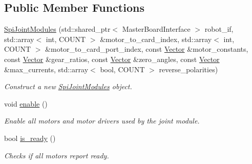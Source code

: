 \subsection*{Public Member Functions}
\begin{DoxyCompactItemize}
\item 
\mbox{\label{classblmc__robots_1_1SpiJointModules_afae5860967bce60813f72ae905b81d13}} 
\hyperlink{classblmc__robots_1_1SpiJointModules_afae5860967bce60813f72ae905b81d13}{Spi\+Joint\+Modules} (std\+::shared\+\_\+ptr$<$ Master\+Board\+Interface $>$ robot\+\_\+if, std\+::array$<$ int, C\+O\+U\+NT $>$ \&motor\+\_\+to\+\_\+card\+\_\+index, std\+::array$<$ int, C\+O\+U\+NT $>$ \&motor\+\_\+to\+\_\+card\+\_\+port\+\_\+index, const \hyperlink{classblmc__robots_1_1SpiJointModules_a2d48f81ec41a42a240e80cd22d4fa2f8}{Vector} \&motor\+\_\+constants, const \hyperlink{classblmc__robots_1_1SpiJointModules_a2d48f81ec41a42a240e80cd22d4fa2f8}{Vector} \&gear\+\_\+ratios, const \hyperlink{classblmc__robots_1_1SpiJointModules_a2d48f81ec41a42a240e80cd22d4fa2f8}{Vector} \&zero\+\_\+angles, const \hyperlink{classblmc__robots_1_1SpiJointModules_a2d48f81ec41a42a240e80cd22d4fa2f8}{Vector} \&max\+\_\+currents, std\+::array$<$ bool, C\+O\+U\+NT $>$ reverse\+\_\+polarities)
\begin{DoxyCompactList}\small\item\em Construct a new \hyperlink{classblmc__robots_1_1SpiJointModules}{Spi\+Joint\+Modules} object. \end{DoxyCompactList}\item 
\mbox{\label{classblmc__robots_1_1SpiJointModules_a427be7b88b487059317425fa2d725d56}} 
void \hyperlink{classblmc__robots_1_1SpiJointModules_a427be7b88b487059317425fa2d725d56}{enable} ()
\begin{DoxyCompactList}\small\item\em Enable all motors and motor drivers used by the joint module. \end{DoxyCompactList}\item 
bool \hyperlink{classblmc__robots_1_1SpiJointModules_a100d408ad8452cddde9c053cc33e8b3b}{is\+\_\+ready} ()
\begin{DoxyCompactList}\small\item\em Checks if all motors report ready. \end{DoxyCompactList}\item 
\mbox{\label{classblmc__robots_1_1SpiJointModules_aed433d32a92fb49a0597d06121f39695}} 

\end{DoxyCompactItemize}
